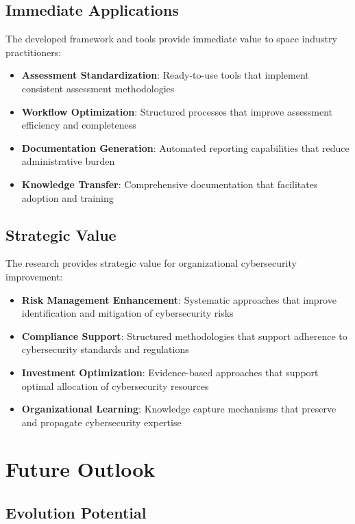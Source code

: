 \documentclass[binding=0.6cm]{sapthesis}
\begin{document}
\subsection{Immediate Applications}

The developed framework and tools provide immediate value to space industry practitioners:

\begin{itemize}
    \item \textbf{Assessment Standardization}: Ready-to-use tools that implement consistent assessment methodologies
    \item \textbf{Workflow Optimization}: Structured processes that improve assessment efficiency and completeness
    \item \textbf{Documentation Generation}: Automated reporting capabilities that reduce administrative burden
    \item \textbf{Knowledge Transfer}: Comprehensive documentation that facilitates adoption and training
\end{itemize}

\subsection{Strategic Value}

The research provides strategic value for organizational cybersecurity improvement:

\begin{itemize}
    \item \textbf{Risk Management Enhancement}: Systematic approaches that improve identification and mitigation of cybersecurity risks
    \item \textbf{Compliance Support}: Structured methodologies that support adherence to cybersecurity standards and regulations
    \item \textbf{Investment Optimization}: Evidence-based approaches that support optimal allocation of cybersecurity resources
    \item \textbf{Organizational Learning}: Knowledge capture mechanisms that preserve and propagate cybersecurity expertise
\end{itemize}

\section{Future Outlook}

\subsection{Evolution Potential}
\end{document}
